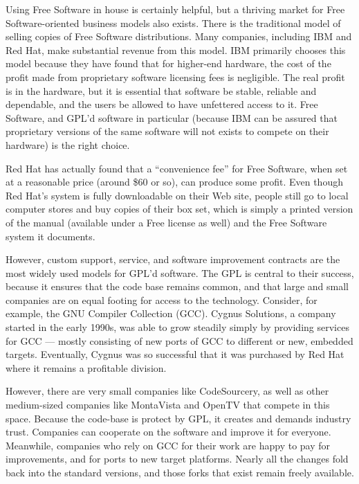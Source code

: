 Using Free Software in house is certainly helpful, but a thriving
market for Free Software-oriented business models also exists. There is the
traditional model of selling copies of Free Software distributions.
Many companies, including IBM and Red Hat, make substantial revenue
from this model. IBM primarily chooses this model because they have
found that for higher-end hardware, the cost of the profit made from
proprietary software licensing fees is negligible. The real profit is
in the hardware, but it is essential that software be stable, reliable
and dependable, and the users be allowed to have unfettered access to
it. Free Software, and GPL'd software in particular (because IBM can
be assured that proprietary versions of the same software will not
exists to compete on their hardware) is the right choice.

Red Hat has actually found that a ``convenience fee'' for Free Software,
when set at a reasonable price (around \$60 or so), can produce some
profit. Even though Red Hat's system is fully downloadable on their
Web site, people still go to local computer stores and buy copies of their
box set, which is simply a printed version of the manual (available under
a Free license as well) and the Free Software system it documents.

\medskip

However, custom support, service, and software improvement contracts
are the most widely used models for GPL'd software. The GPL is
central to their success, because it ensures that the code base
remains common, and that large and small companies are on equal
footing for access to the technology. Consider, for example, the GNU
Compiler Collection (GCC). Cygnus Solutions, a company started in the
early 1990s, was able to grow steadily simply by providing services
for GCC --- mostly consisting of new ports of GCC to different or new,
embedded targets. Eventually, Cygnus was so successful that
it was purchased by Red Hat where it remains a profitable division.

However, there are very small companies like CodeSourcery, as well as
other medium-sized companies like MontaVista and OpenTV that compete in
this space. Because the code-base is protect by GPL, it creates and
demands industry trust. Companies can cooperate on the software and
improve it for everyone. Meanwhile, companies who rely on GCC for their
work are happy to pay for improvements, and for ports to new target
platforms. Nearly all the changes fold back into the standard
versions, and those forks that exist remain freely available.

